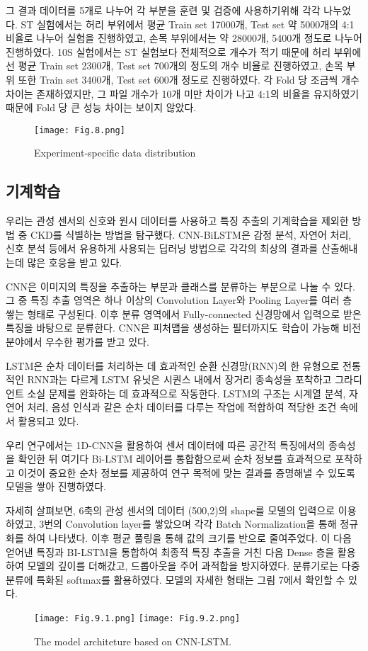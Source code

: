 \documentclass{article}
\begin{document}
그 결과 데이터를 5개로 나누어 각 부분을 훈련 및 검증에 사용하기위해 각각
나누었다. ST 실험에서는 허리 부위에서 평균 Train set 17000개, Test set
약 5000개의 4:1 비율로 나누어 실험을 진행하였고, 손목 부위에서는 약
28000개, 5400개 정도로 나누어 진행하였다. 10S 실험에서는 ST 실험보다
전체적으로 개수가 적기 때문에 허리 부위에선 평균 Train set 2300개, Test
set 700개의 정도의 개수 비율로 진행하였고, 손목 부위 또한 Train set
3400개, Test set 600개 정도로 진행하였다. 각 Fold 당 조금씩 개수 차이는
존재하였지만, 그 파일 개수가 10개 미만 차이가 나고 4:1의 비율을
유지하였기 때문에 Fold 당 큰 성능 차이는 보이지 않았다.

\begin{figure}
\centering
\texttt{[image: Fig.8.png]}
\caption{\label{Figure.8:}Experiment-specific data distribution}
\end{figure}

\subsection{기계학습}

우리는 관성 센서의 신호와 원시 데이터를 사용하고 특징 추출의 기계학습을
제외한 방법 중 CKD를 식별하는 방법을 탐구했다. CNN-BiLSTM은 감정 분석,
자연어 처리, 신호 분석 등에서 유용하게 사용되는 딥러닝 방법으로 각각의
최상의 결과를 산출해내는데 많은 호응을 받고 있다.

CNN은 이미지의 특징을 추출하는 부분과 클래스를 분류하는 부분으로 나눌 수
있다. 그 중 특징 추출 영역은 하나 이상의 Convolution Layer와 Pooling
Layer를 여러 층 쌓는 형태로 구성된다. 이후 분류 영역에서 Fully-connected
신경망에서 입력으로 받은 특징을 바탕으로 분류한다. CNN은 피처맵을
생성하는 필터까지도 학습이 가능해 비전 분야에서 우수한 평가를 받고 있다.

LSTM은 순차 데이터를 처리하는 데 효과적인 순환 신경망(RNN)의 한 유형으로
전통적인 RNN과는 다르게 LSTM 유닛은 시퀀스 내에서 장거리 종속성을
포착하고 그라디언트 소실 문제를 완화하는 데 효과적으로 작동한다. LSTM의
구조는 시계열 분석, 자연어 처리, 음성 인식과 같은 순차 데이터를 다루는
작업에 적합하여 적당한 조건 속에서 활용되고 있다.

우리 연구에서는 1D-CNN을 활용하여 센서 데이터에 따른 공간적 특징에서의
종속성을 확인한 뒤 여기다 Bi-LSTM 레이어를 통합함으로써 순차 정보를
효과적으로 포착하고 이것이 중요한 순차 정보를 제공하여 연구 목적에 맞는
결과를 증명해낼 수 있도록 모델을 쌓아 진행하였다.

자세히 살펴보면, 6축의 관성 센서의 데이터 (500,2)의 shape를 모델의
입력으로 이용하였고, 3번의 Convolution layer를 쌓았으며 각각 Batch
Normalization을 통해 정규화를 하여 나타냈다. 이후 평균 풀링을 통해 값의
크기를 반으로 줄여주었다. 이 다음 얻어낸 특징과 BI-LSTM을 통합하여
최종적 특징 추출을 거친 다음 Dense 층을 활용하여 모델의 깊이를 더해갔고,
드롭아웃을 주어 과적합을 방지하였다. 분류기로는 다중 분류에 특화된
softmax를 활용하였다. 모델의 자세한 형태는 그림 7에서 확인할 수 있다.
\begin{figure}
\centering
\texttt{[image: Fig.9.1.png]}
\texttt{[image: Fig.9.2.png]}
\caption{\label{Figure.9:}The model architeture based on CNN-LSTM.}
\end{figure}
\end{document}
